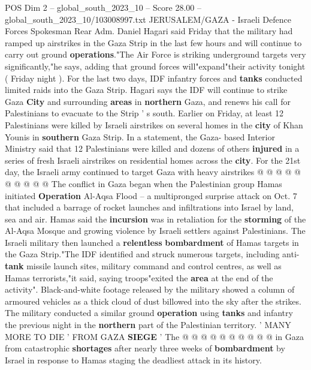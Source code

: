 \begin{textsample}{POS Dim 2 – global\_south\_2023\_10 – Score 28.00 – global\_south\_2023\_10/103008997.txt}  \label{ex:f2_pos_178}
JERUSALEM/GAZA - Israeli Defence Forces Spokesman Rear Adm.
Daniel Hagari said Friday that the military had ramped up airstrikes in the Gaza Strip in the last few hours and will continue to carry out ground \textbf{operations}."The Air Force is striking underground targets very significantly,"he says, adding that ground forces will"expand"their activity tonight ( Friday night ).
For the last two days, IDF infantry forces and \textbf{tanks} conducted limited raids into the Gaza Strip.
Hagari says the IDF will continue to strike Gaza \textbf{City} and surrounding \textbf{areas} in \textbf{northern} Gaza, and renews his call for Palestinians to evacuate to the Strip ' s south.
Earlier on Friday, at least 12 Palestinians were killed by Israeli airstrikes on several homes in the \textbf{city} of Khan Younis in \textbf{southern} Gaza Strip.
In a statement, the Gaza- based Interior Ministry said that 12 Palestinians were killed and dozens of others \textbf{injured} in a series of fresh Israeli airstrikes on residential homes across the \textbf{city}.
For the 21st day, the Israeli army continued to target Gaza with heavy airstrikes @ @ @ @ @ @ @ @ @ @ The conflict in Gaza began when the Palestinian group Hamas initiated \textbf{Operation} Al-Aqsa Flood -- a multipronged surprise attack on Oct. 7 that included a barrage of rocket launches and infiltrations into Israel by land, sea and air.
Hamas said the \textbf{incursion} was in retaliation for the \textbf{storming} of the Al-Aqsa Mosque and growing violence by Israeli settlers against Palestinians.
The Israeli military then launched a \textbf{relentless} \textbf{bombardment} of Hamas targets in the Gaza Strip."The IDF identified and struck numerous targets, including anti- \textbf{tank} missile launch sites, military command and control centres, as well as Hamas terrorists,"it said, saying troops"exited the \textbf{area} at the end of the activity".
Black-and-white footage released by the military showed a column of armoured vehicles as a thick cloud of dust billowed into the sky after the strikes.
The military conducted a similar ground \textbf{operation} using \textbf{tanks} and infantry the previous night in the \textbf{northern} part of the Palestinian territory. ' MANY MORE TO DIE ' FROM GAZA \textbf{SIEGE} ' The @ @ @ @ @ @ @ @ @ @ in Gaza from catastrophic \textbf{shortages} after nearly three weeks of \textbf{bombardment} by Israel in response to Hamas staging the deadliest attack in its history.

\end{textsample}
